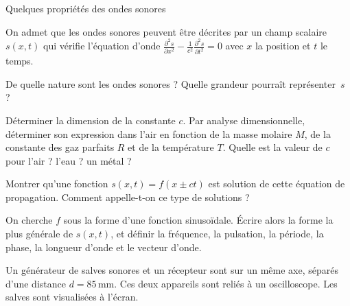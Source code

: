 \begin{exo}[MPSI][1]{Quelques propriétés des ondes sonores}

On admet que les ondes sonores peuvent être décrites par un champ scalaire $s(x,t)$ qui vérifie l'équation d'onde
$
\frac{\partial^2 s}{\partial x^2} - \frac{1}{c^2}\frac{\partial^2 s}{\partial t^2} = 0
$
avec $x$ la position et $t$ le temps.


\begin{quest}

\item De quelle nature sont les ondes sonores ? Quelle grandeur pourraît représenter~$s$ ?


\item Déterminer la dimension de la constante $c$. Par analyse dimensionnelle, déterminer son expression dans l'air  en fonction de la masse molaire $M$, de la constante des gaz parfaits $R$ et de la température $T$. Quelle est la valeur de $c$ pour l'air ? l'eau ? un métal ?


\item Montrer qu'une fonction $s(x,t)=f(x\pm ct)$ est solution de cette équation de propagation. Comment appelle-t-on ce type de solutions ?


\item On cherche $f$ sous la forme d'une fonction sinusoïdale. Écrire alors la forme la plus générale de $s(x,t)$,
et définir la fréquence, la pulsation, la période, la phase, la longueur d'onde et le vecteur d'onde.



\end{quest}

Un générateur de salves sonores et un
récepteur sont sur un même axe, séparés
d'une distance $d = 85\,$mm. Ces deux appareils
sont reliés à un oscilloscope. Les salves sont
visualisées à l'écran.



\end{exo}
